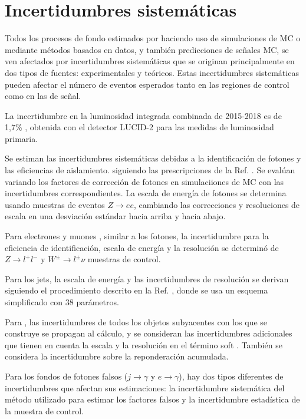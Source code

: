 \section{Incertidumbres sistemáticas}


Todos los procesos de fondo estimados por
haciendo uso de simulaciones de MC o mediante métodos basados en datos, y también predicciones de señales MC,
se ven afectados por incertidumbres sistemáticas que se originan principalmente en dos tipos de fuentes:
experimentales y teóricos. Estas incertidumbres sistemáticas pueden afectar el número de eventos esperados tanto en las regiones de control como en las de señal.

La incertidumbre en la luminosidad integrada combinada de 2015-2018 es de 1,7\% \cite{ATLAS-CONF-2019-021}, obtenida con el detector LUCID-2 \cite{Avoni_2018} para las medidas de luminosidad primaria.

Se estiman las incertidumbres sistemáticas debidas a la identificación de fotones y las eficiencias de aislamiento.
siguiendo las prescripciones de la Ref. \cite{EGAM-2018-01}. Se evalúan variando los factores de corrección de fotones en simulaciiones de MC con las incertidumbres correspondientes. La escala de energía de fotones se determina usando muestras de eventos $Z \to ee$, cambiando las correcciones y resoluciones de escala en una desviación estándar hacia arriba y hacia abajo.

Para electrones \cite{EGAM-2018-01} y muones \cite{PERF-2015-10}, similar
a los fotones, la incertidumbre para la eficiencia de identificación, escala de energía y
la resolución se determinó de $Z \to l^{+}l^{-}$ y
$W^{\pm}\to l^{\pm}\nu$ muestras de control.

Para los jets, la escala de energía y las incertidumbres de resolución se derivan siguiendo el
procedimiento descrito en la Ref. \cite{PERF-2016-04}, donde se usa un esquema simplificado con 38 parámetros.

Para \met, las incertidumbres de todos los objetos subyacentes con los que se
construye se propagan al cálculo, y se consideran las incertidumbres adicionales que tienen en cuenta la escala y la resolución en el término soft \cite{PERF-2016-07}.
También se considera la incertidumbre sobre la reponderación acumulada.

Para los fondos de fotones falsos ($j\to\gamma$ y $e\to\gamma$), hay
dos tipos diferentes de incertidumbres que afectan sus estimaciones: la incertidumbre sistemática del método utilizado para estimar los factores falsos y la
incertidumbre estadística de la muestra de control.

